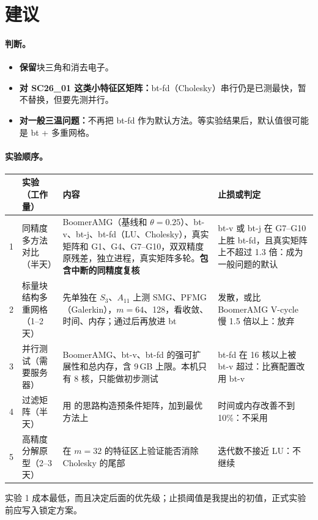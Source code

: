 \documentclass[11pt,a4paper]{ctexart}
\begin{document}
\section{建议}
\paragraph{判断。}
\begin{itemize}
\item \textbf{保留}块三角和消去电子。
\item \textbf{对 SC26\_01 这类小特征区矩阵：}bt-fd（Cholesky）串行仍是已测最快，暂不替换，但要先测并行。
\item \textbf{对一般三温问题：}不再把 bt-fd 作为默认方法。等实验结果后，默认值很可能是 bt + 多重网格。
\end{itemize}

\paragraph{实验顺序。}
\begin{table}[H]
\centering\small
\begin{tabular}{cp{2.5cm}p{7.2cm}p{4.6cm}}
\toprule
 & 实验（工作量） & 内容 & 止损或判定 \\
\midrule
1 & 同精度多方法对比（半天） & BoomerAMG（基线和 $\theta=0.25$）、bt-v、bt-j、bt-fd（LU、Cholesky），真实矩阵和 G1、G4、G7--G10，双双精度原残差，独立进程，真实矩阵多轮。\textbf{包含中断的同精度复核} & bt-v 或 bt-j 在 G7--G10 上胜 bt-fd，且真实矩阵上不超过 1.3 倍：成为一般问题的默认 \\
2 & 标量块结构多重网格（1--2 天） & 先单独在 $S_3$、$A_{11}$ 上测 SMG、PFMG（Galerkin），$m=64$、128，看收敛、时间、内存；通过后再放进 bt & 发散，或比 BoomerAMG V-cycle 慢 1.5 倍以上：放弃 \\
3 & 并行测试（需要服务器） & BoomerAMG、bt-v、bt-fd 的强可扩展性和总内存，含 9\,GB 上限。本机只有 8 核，只能做初步测试 & bt-fd 在 16 核以上被 bt-v 超过：比赛配置改用 bt-v \\
4 & 过滤矩阵（半天） & 用 \cite{ye2021} 的思路构造预条件矩阵，加到最优方法上 & 时间或内存改善不到 10\%：不采用 \\
5 & 高精度分解原型（2--3 天） & 在 $m=32$ 的特征区上验证能否消除 Cholesky 的尾部 & 迭代数不接近 LU：不继续 \\
\bottomrule
\end{tabular}
\end{table}
实验 1 成本最低，而且决定后面的优先级；止损阈值是我提出的初值，正式实验前应写入锁定方案。
\end{document}
